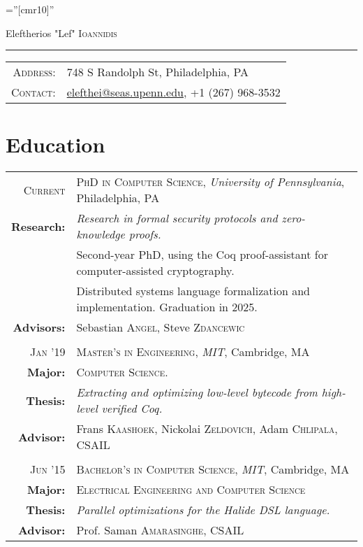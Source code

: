 \documentclass[lettersize,11pt]{article}
\begin{document}
\pagestyle{empty} %
\font\fb=''[cmr10]'' %

\par{\centering
		{\Huge Eleftherios "Lef" \textsc{Ioannidis}
	}
	\bigskip\par}

\hrule
\begin{tabular}{rl}
    \textsc{Address:}   & 748 S Randolph St, Philadelphia, PA \\
    \textsc{Contact:}   & \href{mailto:elefthei@seas.upenn.edu}{elefthei@seas.upenn.edu}, +1 (267) 968-3532 \\
\end{tabular}

\section{Education}
\begin{tabular}{rl}
\textsc{Current} & \textsc{PhD in Computer Science}, \emph{University of Pennsylvania}, Philadelphia, PA\\
\textbf{Research:} & \emph{Research in formal security protocols and zero-knowledge proofs.}\\
& Second-year PhD, using the Coq proof-assistant for computer-assisted cryptography. \\
& Distributed systems language formalization and implementation. Graduation in 2025. \\
\textbf{Advisors:} & Sebastian \textsc{Angel}, Steve \textsc{Zdancewic}\\
& \\
\textsc{Jan} '19 & \textsc{Master's in Engineering}, \emph{MIT}, Cambridge, MA\\
\textbf{Major:} & \textsc{Computer Science.}\\
\textbf{Thesis:} & \emph{Extracting and optimizing low-level bytecode from high-level verified Coq.}\\
\textbf{Advisor:} & Frans \textsc{Kaashoek}, Nickolai \textsc{Zeldovich}, Adam \textsc{Chlipala},  CSAIL\\
 & \\
\textsc{Jun} '15 & \textsc{Bachelor's in Computer Science}, \emph{MIT}, Cambridge, MA\\
\textbf{Major:} & \textsc{Electrical Engineering and Computer Science}\\
\textbf{Thesis:} & \emph{Parallel optimizations for the Halide DSL language.}\\
\textbf{Advisor:} & Prof. Saman \textsc{Amarasinghe}, CSAIL\\
\end{tabular}
\end{document}
